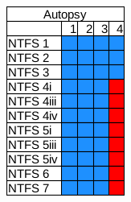 \begin{figure}
    \centering

    \begin{subfigure}{0.16\linewidth}
        \includegraphics[width=\linewidth]{fig/autopsy_results_ntfs.png}
    \end{subfigure}    
    \begin{subfigure}{0.16\linewidth}

\end{subfigure}
\end{figure}
